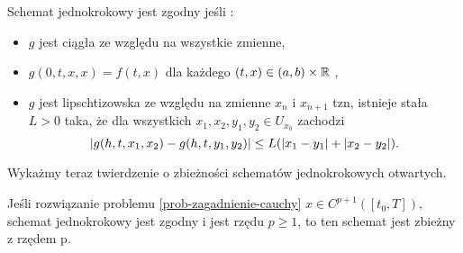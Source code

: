 \documentclass[12pt,a4paper]{report}
\begin{document}
\begin{definition}\label{definition-consistency}
Schemat jednokrokowy jest zgodny jeśli :
\begin{itemize}
\item $g$ jest ciągła ze względu na wszystkie zmienne,
\item $g(0,t,x,x) = f(t,x)$ dla każdego $(t,x) \in (a,b) \times \mathbb{R}$ ,
\item $g$ jest lipschtizowska ze względu na zmienne $x_n$ i $x_{n+1}$ tzn, istnieje stała $L>0$ taka, że dla wszystkich $x_1,x_2,y_1,y_2 \in U_{x_0}$ zachodzi
$$
{\left| {g(h,t,x_1,x_2) - g(h,t,y_1,y_2)} \right|} \leq L  ( {\left| {x_1 - y_1} \right|} + {\left| {x_2 - y_2} \right|}).
$$
\end{itemize}
\end{definition}
Wykażmy teraz twierdzenie o zbieżności schematów jednokrokowych otwartych. 
\begin{theorem} \label{theorem-convergence-one-step-schema} 
Jeśli rozwiązanie problemu \ref{prob-zagadnienie-cauchy} $x \in C^{p+1}([t_0,T])$, schemat jednokrokowy jest zgodny i jest rzędu $p\geqslant1$, to ten schemat jest zbieżny z rzędem p. 
\end{theorem}
\end{document}
